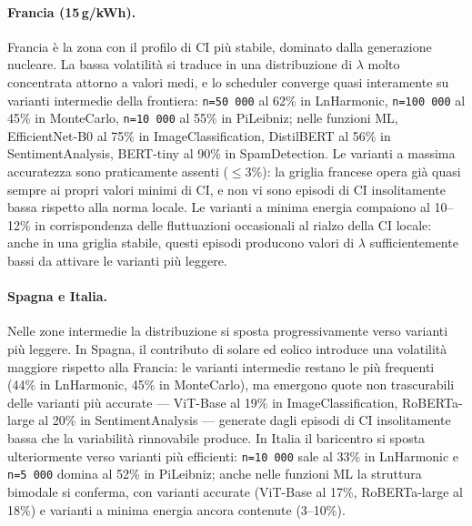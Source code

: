 \paragraph{Francia (15\,g/kWh).}
Francia è la zona con il profilo di CI più stabile, dominato dalla generazione
nucleare. La bassa volatilità si traduce in una distribuzione di $\lambda$ molto
concentrata attorno a valori medi, e lo scheduler converge quasi interamente
su varianti intermedie della frontiera: \texttt{n=50\,000} al 62\% in
LnHarmonic, \texttt{n=100\,000} al 45\% in MonteCarlo, \texttt{n=10\,000} al
55\% in PiLeibniz; nelle funzioni ML, EfficientNet-B0 al 75\% in
ImageClassification, DistilBERT al 56\% in SentimentAnalysis, BERT-tiny al
90\% in SpamDetection. Le varianti a massima accuratezza sono praticamente
assenti ($\leq 3$\%): la griglia francese opera già quasi sempre ai propri
valori minimi di CI, e non vi sono episodi di CI insolitamente bassa rispetto
alla norma locale. Le varianti a minima energia compaiono al 10--12\% in corrispondenza delle
fluttuazioni occasionali al rialzo della CI locale: anche in una griglia
stabile, questi episodi producono valori di $\lambda$ sufficientemente bassi
da attivare le varianti più leggere.

\paragraph{Spagna e Italia.}
Nelle zone intermedie la distribuzione si sposta progressivamente verso
varianti più leggere. In Spagna, il contributo di solare ed eolico introduce
una volatilità maggiore rispetto alla Francia: le varianti intermedie restano
le più frequenti (44\% in LnHarmonic, 45\% in MonteCarlo), ma emergono quote
non trascurabili delle varianti più accurate --- ViT-Base al 19\% in
ImageClassification, RoBERTa-large al 20\% in SentimentAnalysis --- generate
dagli episodi di CI insolitamente bassa che la variabilità rinnovabile produce.
In Italia il baricentro si sposta ulteriormente verso varianti più efficienti:
\texttt{n=10\,000} sale al 33\% in LnHarmonic e \texttt{n=5\,000} domina al
52\% in PiLeibniz; anche nelle funzioni ML la struttura bimodale si conferma,
con varianti accurate (ViT-Base al 17\%, RoBERTa-large al 18\%) e varianti a
minima energia ancora contenute (3--10\%).

